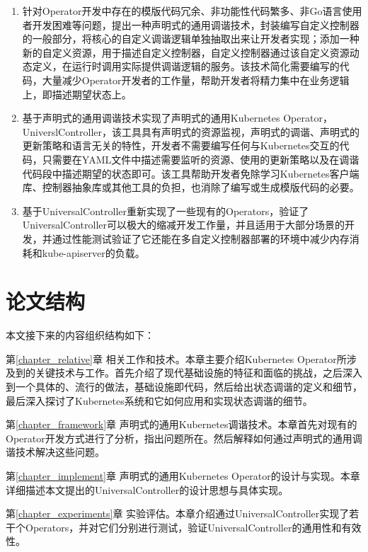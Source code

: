 \documentclass[macfonts,master]{njuthesis}
\begin{document}
\begin{enumerate}
	\item 针对Operator开发中存在的模版代码冗余、非功能性代码繁多、非Go语言使用者开发困难等问题，提出一种声明式的通用调谐技术，封装编写自定义控制器的一般部分，将核心的自定义调谐逻辑单独抽取出来让开发者实现；添加一种新的自定义资源，用于描述自定义控制器，自定义控制器通过该自定义资源动态定义，在运行时调用实际提供调谐逻辑的服务。该技术简化需要编写的代码，大量减少Operator开发者的工作量，帮助开发者将精力集中在业务逻辑上，即描述期望状态上。
	\item 基于声明式的通用调谐技术实现了声明式的通用Kubernetes Operator，UniverslController，该工具具有声明式的资源监视，声明式的调谐、声明式的更新策略和语言无关的特性，开发者不需要编写任何与Kubernetes交互的代码，只需要在YAML文件中描述需要监听的资源、使用的更新策略以及在调谐代码段中描述期望的状态即可。该工具帮助开发者免除学习Kubernetes客户端库、控制器抽象库或其他工具的负担，也消除了编写或生成模版代码的必要。
	\item 基于UniversalController重新实现了一些现有的Operators，验证了UniversalController可以极大的缩减开发工作量，并且适用于大部分场景的开发，并通过性能测试验证了它还能在多自定义控制器部署的环境中减少内存消耗和kube-apiserver的负载。
\end{enumerate}


\section{论文结构}
本文接下来的内容组织结构如下：


第\ref{chapter_relative}章 相关工作和技术。本章主要介绍Kubernetes Operator所涉及到的关键技术与工作。首先介绍了现代基础设施的特征和面临的挑战，之后深入到一个具体的、流行的做法，基础设施即代码，然后给出状态调谐的定义和细节，最后深入探讨了Kubernetes系统和它如何应用和实现状态调谐的细节。

第\ref{chapter_framework}章 声明式的通用Kubernetes调谐技术。本章首先对现有的Operator开发方式进行了分析，指出问题所在。然后解释如何通过声明式的通用调谐技术解决这些问题。

第\ref{chapter_implement}章 声明式的通用Kubernetes Operator的设计与实现。本章详细描述本文提出的UniversalController的设计思想与具体实现。

第\ref{chapter_experiments}章 实验评估。本章介绍通过UniversalController实现了若干个Operators，并对它们分别进行测试，验证UniversalController的通用性和有效性。
\end{document}
